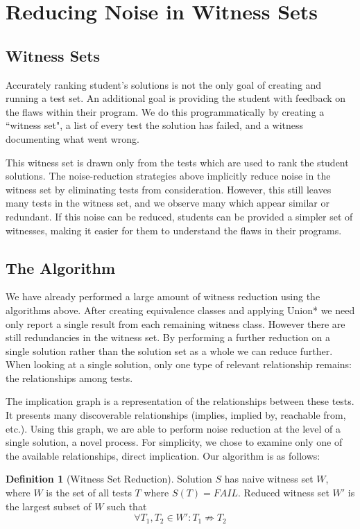 \documentclass[11pt,twoside]{article}
\newcommand\fail{\mathit{FAIL}}
\theoremstyle{definition}
\newtheorem{defn}{Definition}
\begin{document}
\section{Reducing Noise in Witness Sets}
\subsection{Witness Sets}
Accurately ranking student's solutions is not the only goal of creating and running a test set. An additional goal is providing the student with feedback on the flaws within their program. We do this programmatically by creating a ``witness set", a list of every test the solution has failed, and a witness documenting what went wrong.

This witness set is drawn only from the tests which are used to rank the student solutions. The noise-reduction strategies above implicitly reduce noise in the witness set by eliminating tests from consideration. However, this still leaves many tests in the witness set, and we observe many which appear similar or redundant. If this noise can be reduced, students can be provided a simpler set of witnesses, making it easier for them to understand the flaws in their programs.

\subsection{The Algorithm}
We have already performed a large amount of witness reduction using the algorithms above. After creating equivalence classes and applying Union* we need only report a single result from each remaining witness class. However there are still redundancies in the witness set. By performing a further reduction on a single solution rather than the solution set as a whole we can reduce further. When looking at a single solution, only one type of relevant relationship remains: the relationships among tests.

The implication graph is a representation of the relationships between these tests. It presents many discoverable relationships (implies, implied by, reachable from, etc.). Using this graph, we are able to perform noise reduction at the level of a single solution, a novel process. For simplicity, we chose to examine only one of the available relationships, direct implication. Our algorithm is as follows:

\begin{defn}[Witness Set Reduction]
Solution $S$ has naive witness set $W$, where $W$ is the set of all tests $T$ where $S(T) = \fail$.
Reduced witness set $W'$ is the largest subset of $W$ such that
$$\forall T_1, T_2 \in W' : T_1 \not\Rightarrow T_2$$
\end{defn}
\end{document}
